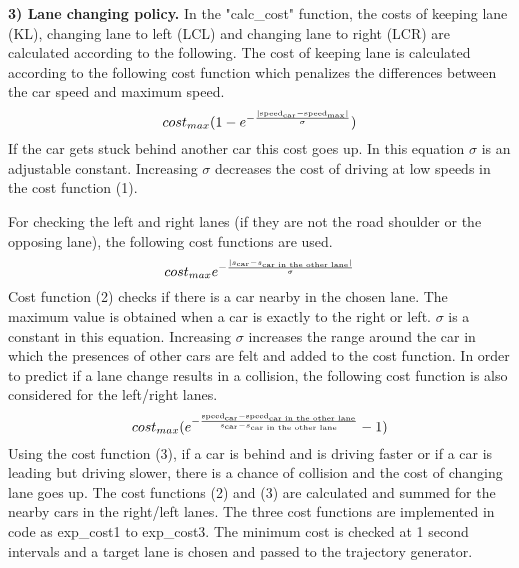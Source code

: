 \documentclass[12pt]{article}
\begin{document}
\textbf{ 3) Lane changing policy.}
In the "calc\_cost" function, the costs of keeping lane (KL), changing lane to left (LCL) and changing lane to right (LCR) are calculated according to the following. The cost of keeping lane is calculated according to the following cost function which penalizes the differences between the car speed and maximum speed. 
\begin{equation}
cost_{max}(1-e^{-\frac{|\text{speed}_{\text{car}} - \text{speed}_{\text{max}}|}{\sigma}})\\
\end{equation}
If the car gets stuck behind another car this cost goes up. In this equation $\sigma$ is an adjustable constant. Increasing $\sigma$ decreases the cost of driving at low speeds in the cost function (1). 


For checking the left and right lanes (if they are not the road shoulder or the opposing lane), the following cost functions are used.
\begin{equation}
cost_{max}e^{-\frac{|s_{\text{car}}-s_{\text{car in the other lane}}|}{\sigma}}\\
\end{equation}
Cost function (2) checks if there is a car nearby in the chosen lane. The maximum value is obtained when a car is exactly to the right or left. $\sigma$ is a constant in this equation. Increasing $\sigma$ increases the range around the car in which the presences of other cars are felt and added to the cost function. In order to predict if a lane change results in a collision, the following cost function is also considered for the left/right lanes.
\begin{equation}
cost_{max}(e^{-\frac{\text{speed}_{\text{car}}-\text{speed}_{\text{car in the other lane}}}{s_{\text{car}}-s_{\text{car in the other lane}}}}-1)\\
\end{equation}
Using the cost function (3), if a car is behind and is driving faster or if a car is leading but driving slower, there is a chance of collision and the cost of changing lane goes up. 
The cost functions (2) and (3) are calculated and summed for the nearby cars in the right/left lanes. The three cost functions are implemented in code as exp\_cost1 to exp\_cost3. The minimum cost is checked at 1 second intervals and a target lane is chosen and passed to the trajectory generator. 
\end{document}
